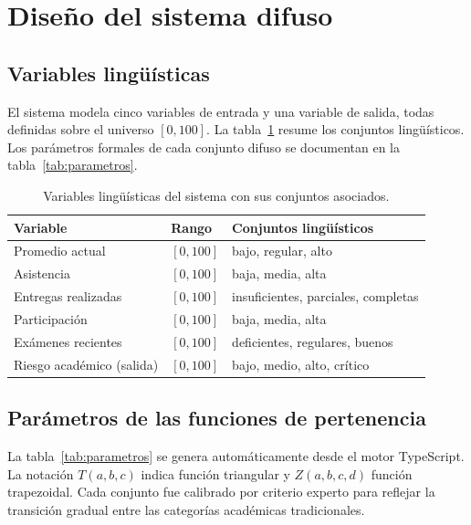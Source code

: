 


\section{Diseño del sistema difuso}

\subsection{Variables lingüísticas}

El sistema modela cinco variables de entrada y una variable de salida, todas definidas sobre el universo $[0,100]$. La tabla~\ref{tab:variables} resume los conjuntos lingüísticos. Los parámetros formales de cada conjunto difuso se documentan en la tabla~\ref{tab:parametros}.

\begin{table}[H]
  \centering
  \small
  \begin{tabularx}{0.96\linewidth}{l l X}
    \toprule
    \textbf{Variable} & \textbf{Rango} & \textbf{Conjuntos lingüísticos}\\
    \midrule
    Promedio actual & $[0,100]$ & bajo, regular, alto\\
    Asistencia & $[0,100]$ & baja, media, alta\\
    Entregas realizadas & $[0,100]$ & insuficientes, parciales, completas\\
    Participación & $[0,100]$ & baja, media, alta\\
    Exámenes recientes & $[0,100]$ & deficientes, regulares, buenos\\
    \midrule
    Riesgo académico (salida) & $[0,100]$ & bajo, medio, alto, crítico\\
    \bottomrule
  \end{tabularx}
  \caption{Variables lingüísticas del sistema con sus conjuntos asociados.}
  \label{tab:variables}
\end{table}

\subsection{Parámetros de las funciones de pertenencia}

La tabla~\ref{tab:parametros} se genera automáticamente desde el motor TypeScript. La notación $T(a,b,c)$ indica función triangular y $Z(a,b,c,d)$ función trapezoidal. Cada conjunto fue calibrado por criterio experto para reflejar la transición gradual entre las categorías académicas tradicionales.

